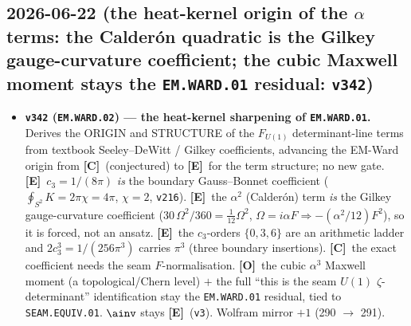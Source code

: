 \documentclass[11pt]{article}
\providecommand{\mE}{\textbf{[E]}}\providecommand{\mC}{\textbf{[C]}}
\providecommand{\mO}{\textbf{[O]}}\providecommand{\mX}{\textbf{[X]}}
\providecommand{\vref}[1]{\texttt{#1}}
\providecommand{\cthree}{c_3}\providecommand{\phiz}{\varphi_0^{\mathrm{ret}}}
\begin{document}
\subsection*{2026-06-22 (the heat-kernel origin of the $\alpha$ terms: the Calder\'on quadratic is the Gilkey gauge-curvature coefficient; the cubic Maxwell moment stays the \texttt{EM.WARD.01} residual: \texttt{v342})}
\begin{itemize}
\item \textbf{\texttt{v342} (\texttt{EM.WARD.02}) --- the heat-kernel sharpening of \texttt{EM.WARD.01}.} Derives the
ORIGIN and STRUCTURE of the $F_{U(1)}$ determinant-line terms from textbook Seeley--DeWitt / Gilkey coefficients,
advancing the EM-Ward origin from \mC\ (conjectured) to \mE\ for the term structure; no new gate. \mE\ $\cthree=
1/(8\pi)$ \emph{is} the boundary Gauss--Bonnet coefficient ($\oint_{S^2}K=2\pi\chi=4\pi$, $\chi{=}2$, \vref{v216}).
\mE\ the $\alpha^2$ (Calder\'on) term \emph{is} the Gilkey gauge-curvature coefficient ($30\,\Omega^2/360=\tfrac1{12}
\Omega^2$, $\Omega{=}i\alpha F\Rightarrow-(\alpha^2/12)F^2$), so it is forced, not an ansatz. \mE\ the $\cthree$-orders
$\{0,3,6\}$ are an arithmetic ladder and $2\cthree^3=1/(256\pi^3)$ carries $\pi^3$ (three boundary insertions). \mC\
the exact coefficient needs the seam $F$-normalisation. \mO\ the cubic $\alpha^3$ Maxwell moment (a topological/Chern
level) $+$ the full ``this is the seam $U(1)$ $\zeta$-determinant'' identification stay the \texttt{EM.WARD.01}
residual, tied to \texttt{SEAM.EQUIV.01}. $\ainv$ stays \mE\ (\vref{v3}). Wolfram mirror $+1$ (290 $\to$ 291).
\end{itemize}
\end{document}
